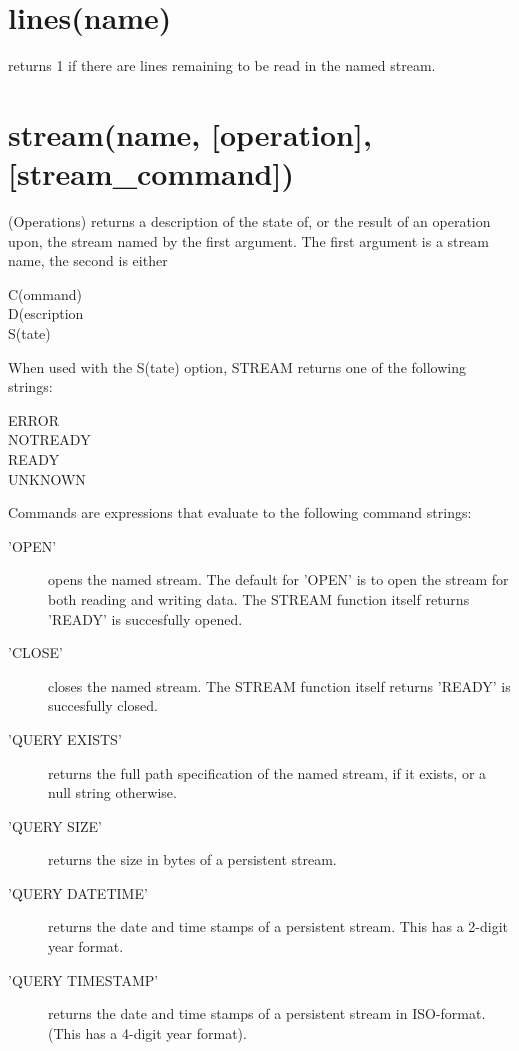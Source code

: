 \section{lines(name)} returns 1 if there are lines remaining to be read in the named stream.

\section{stream(name, [operation{]}, [stream\_command{]})}    (Operations) returns a description of the state of, or the result of an
operation upon, the stream named by the first argument. The first
argument is a stream name, the second is either
\begin{description}
\item[C(ommand)]
\item[D(escription]
\item[S(tate)]
\end{description}

When used with the S(tate) option, STREAM
returns one of the following strings:
\begin{description}
\item[ERROR]
\item[NOTREADY]
\item[READY]
\item[UNKNOWN]
\end{description}

Commands are expressions that evaluate to the following command
strings:
\begin{description}
  \item['OPEN'] opens the named stream. The default for 'OPEN' is to
    open the stream for both reading and writing data. The STREAM function itself
    returns 'READY' is succesfully opened.
  \item['CLOSE'] closes the named stream. The STREAM function itself
    returns 'READY' is succesfully closed.
  \item['QUERY EXISTS'] returns the full path specification of the
    named stream, if it exists, or a null string otherwise.
  \item['QUERY SIZE'] returns the size in bytes of a persistent
    stream.
  \item['QUERY DATETIME'] returns the date and time stamps of a
    persistent stream. This has a 2-digit year format.
  \item['QUERY TIMESTAMP'] returns the date and time stamps of a
    persistent stream in ISO-format. (This has a 4-digit year format).
  \end{description}

